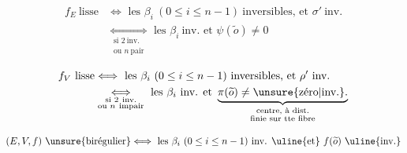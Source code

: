 \[
\begin{aligned}
f_E\ \text{lisse}&\Longleftrightarrow\text{ les }\beta_i\ (0\le i\le n-1)\ \text{inversibles, et }\sigma'\ \text{inv.}\\
&\underset{\substack{\text{si }2\ \text{inv.}\\\text{ou }n\ \text{pair}}}{\Longleftrightarrow}\text{ les }\beta_i\ \text{inv. et }\psi(\widetilde{o})\ne0
\end{aligned}
\]

\[
\begin{aligned}
f_V\ \text{lisse}&\Longleftrightarrow\text{ les }\beta_i\ (0\le i\le n-1)\ \text{inversibles, et }\rho'\ \text{inv.}\\
&\underset{\substack{\text{si }2\ \text{inv.}\\\text{ou }n\ \text{impair}}}{\Longleftrightarrow}
\text{ les }\beta_i\ \text{inv. et }\underbrace{\pi(\widetilde{o})\ne\text{\unsure{zéro|inv.}.}}_{\substack{\text{centre, à dist.}\\\text{finie sur tte fibre}}}
\end{aligned}
\]

\[
(E,V,f)\ \text{\unsure{birégulier}}\Longleftrightarrow
\text{ les }\beta_i\ (0\le i\le n-1)\ \text{inv. \uline{et} }f(\widetilde{o})\ \text{\uline{inv.}}
\]



